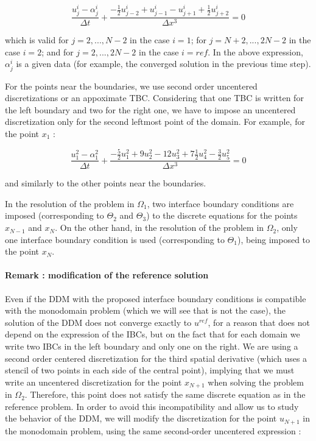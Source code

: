 \begin{equation}
    \label{eq:FDdiscretization}
    \frac{u_j^i - \alpha_j^i}{\Delta t} + \frac{-\frac{1}{2}u_{j-2}^i + u_{j-1}^i - u_{j+1}^i + \frac{1}{2}u_{j+2}^i }{\Delta x ^3} = 0
\end{equation}

\noindent which is valid for $j=2,...,N-2$ in the case $i=1$; for $j=N+2,...,2N-2$ in the case $i=2$; and for $j=2,...,2N-2$ in the case $i=ref$. In the above expression, $\alpha_j^i$ is a given data (for example, the converged solution in the previous time step).

\indent For the points near the boundaries, we use second order uncentered discretizations or an appoximate TBC. Considering that one TBC is written for the left boundary and two for the right one, we have to impose an uncentered discretization only for the second leftmost point of the domain. For example, for the point $x_1$ : 

\begin{equation}
    \label{eq:uncenteredFDdiscretization0}
    \frac{u_{1}^2 - \alpha_{1}^2}{\Delta t} + \frac{-\frac{5}{2}u_{1}^2 + 9u_{2}^2 - 12 u_{3}^2 + 7\frac{1}{2}u_{4}^2 -\frac{3}{2}u_{5}^2}{\Delta x ^3} = 0
\end{equation}

\noindent and similarly to the other points near the boundaries.

\indent In the resolution of the problem in $\Omega_1$, two interface boundary conditions are imposed (corresponding to $\Theta_2$ and $\Theta_3$) to the discrete equations for the points $x_{N-1}$ and $x_N$. On the other hand, in the resolution of the problem in $\Omega_2$, only one interface boundary condition is used (corresponding to $\Theta_1$), being imposed to the point $x_N$.

\paragraph{Remark : modification of the reference solution}

\indent  Even if the DDM with the proposed interface boundary conditions is compatible with the monodomain problem (which we will see that is not the case), the solution of the DDM does not converge exactly to $u^{ref}$, for a reason that does not depend on the expression of the IBCs, but on the fact that for each domain we write two IBCs in the left boundary and only one on the right. We are using a second order centered discretization for the third spatial derivative (which uses a stencil of two points in each side of the central point), implying that we must write an uncentered discretization for the point $x_{N+1}$ when solving the problem in $\Omega_2$. Therefore, this point does not satisfy the same discrete equation as in the reference problem. In order to avoid this incompatibility and allow us to study the behavior of the DDM, we will modify the discretization for the point $u_{N+1}$ in the monodomain problem, using the same second-order uncentered expression :

